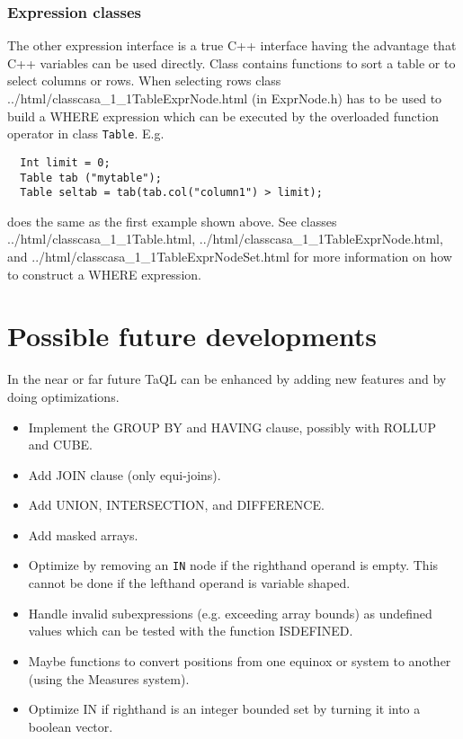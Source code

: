 \subsubsection{Expression classes}
    The other expression interface is a true C++ interface having the
    advantage that C++ variables can be used directly. Class
    contains functions to sort a table or to select columns or rows.
    When selecting rows class 
    {../html/classcasa_1_1TableExprNode.html} (in ExprNode.h)
    has to be used to
    build a WHERE expression which can be executed by the overloaded
    function operator in class \texttt{Table}. E.g.
\begin{verbatim}
  Int limit = 0;
  Table tab ("mytable");
  Table seltab = tab(tab.col("column1") > limit);
\end{verbatim}
    does the same as the first example shown above.
    See classes 
    {../html/classcasa_1_1Table.html},
    {../html/classcasa_1_1TableExprNode.html}, and
    {../html/classcasa_1_1TableExprNodeSet.html} for more
    information on how to construct a WHERE expression.


\section{Possible future developments}
In the near or far future TaQL can be enhanced by adding new
features and by doing optimizations.
\begin{itemize}
  \item Implement the GROUP BY and  HAVING clause, possibly with
    ROLLUP and CUBE.
  \item Add JOIN clause (only equi-joins).
  \item Add UNION, INTERSECTION, and DIFFERENCE.
  \item Add masked arrays.
  \item Optimize by removing an \texttt{IN} node if the righthand
    operand is empty. This cannot be done if the lefthand operand
    is variable shaped.
  \item Handle invalid subexpressions (e.g. exceeding array bounds)
    as undefined values
    which can be tested with the function ISDEFINED.
  \item Maybe functions to convert positions from one equinox or system
    to another (using the Measures system).
  \item Optimize IN if righthand is an integer bounded set by turning
    it into a boolean vector.
\end{itemize}
